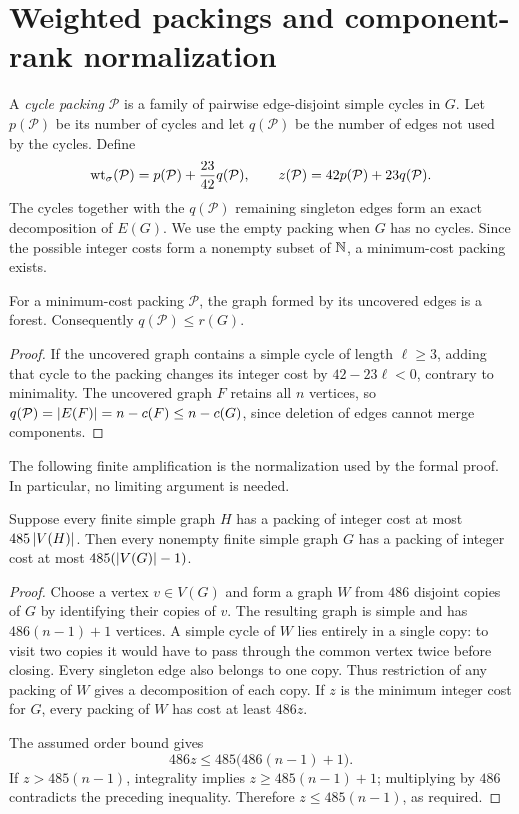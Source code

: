 \section{Weighted packings and component-rank normalization}\label{sec:weighted}
A \emph{cycle packing} $\mathcal P$ is a family of pairwise edge-disjoint
simple cycles in $G$. Let $p(\mathcal P)$ be its number of cycles and let
$q(\mathcal P)$ be the number of edges not used by the cycles. Define
\begin{equation}\label{eq:weights}
 \operatorname{wt}_\sigma(\mathcal P)=p(\mathcal P)+\frac{23}{42}q(\mathcal P),
 \qquad
 z(\mathcal P)=42p(\mathcal P)+23q(\mathcal P).
\end{equation}
The cycles together with the $q(\mathcal P)$ remaining singleton edges form
an exact decomposition of $E(G)$. We use the empty packing when $G$ has no
cycles. Since the possible integer costs form a nonempty subset of $\mathbb N$,
a minimum-cost packing exists.

\begin{lemma}\label{lem:forest}
For a minimum-cost packing $\mathcal P$, the graph formed by its uncovered
edges is a forest. Consequently $q(\mathcal P)\le r(G)$.
\end{lemma}
\begin{proof}
If the uncovered graph contains a simple cycle of length $\ell\ge3$, adding
that cycle to the packing changes its integer cost by $42-23\ell<0$,
contrary to minimality. The uncovered graph $F$ retains all $n$ vertices,
so $q(\mathcal P)=\left|E(F)\right|=n-c(F)\le n-c(G)$, since deletion of edges
cannot merge components.
\end{proof}

The following finite amplification is the normalization used by the
formal proof. In particular, no limiting argument is needed.
\begin{lemma}\label{lem:amplification}
Suppose every finite simple graph $H$ has a packing of integer cost at most
$485\left|V(H)\right|$. Then every nonempty finite simple graph $G$ has a packing
of integer cost at most $485(\left|V(G)\right|-1)$.
\end{lemma}
\begin{proof}
Choose a vertex $v\in V(G)$ and form a graph $W$ from $486$ disjoint copies
of $G$ by identifying their copies of $v$. The resulting graph is simple and
has $486(n-1)+1$ vertices. A simple cycle of $W$ lies entirely in a single
copy: to visit two copies it would have to pass through the common vertex
twice before closing. Every singleton edge also belongs to one copy.
Thus restriction of any packing of $W$ gives a decomposition of each copy.
If $z$ is the minimum integer cost for $G$, every packing of $W$ has cost
at least $486z$.

The assumed order bound gives
\[
 486z\le485\bigl(486(n-1)+1\bigr).
\]
If $z>485(n-1)$, integrality implies $z\ge485(n-1)+1$; multiplying by
$486$ contradicts the preceding inequality. Therefore
$z\le485(n-1)$, as required.
\end{proof}

